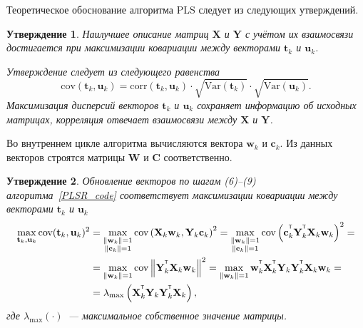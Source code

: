 \documentclass[12pt,twoside]{article}
\newtheorem{statement}{Утверждение}
\newcommand{\bw}{\mathbf{w}}
\newcommand{\bY}{\mathbf{Y}}
\newcommand{\bX}{\mathbf{X}}
\newcommand{\bu}{\mathbf{u}}
\newcommand{\bt}{\mathbf{t}}
\newcommand{\bc}{\mathbf{c}}
\newcommand{\bC}{\mathbf{C}}
\newcommand{\bW}{\mathbf{W}}
\begin{document}
Теоретическое обоснование алгоритма PLS следует из следующих утверждений.
\begin{statement}
Наилучшее описание матриц $\bX$ и $\bY$ с учётом их взаимосвязи достигается при максимизации ковариации между векторами $\bt_k$ и $\bu_k$. 

Утверждение следует из следующего равенства
\[
	\text{cov} (\bt_k, \bu_k) = \text{corr} (\bt_k, \bu_k) \cdot \sqrt{\text{Var}(\bt_k)} \cdot \sqrt{\text{Var}(\bu_k)}.
\]
Максимизация дисперсий векторов $\bt_k$ и $\bu_k$ сохраняет информацию об исходных матрицах, 
корреляция отвечает взаимосвязи между $\bX$ и $\bY$.
\end{statement}
Во внутреннем цикле алгоритма вычисляются вектора $\bw_k$ и $\bc_k$. Из данных векторов строятся матрицы $\bW$ и $\bC$ соответственно.
\begin{statement}
Обновление векторов по шагам (6)--(9) алгоритма~\ref{PLSR_code} соответствует максимизации ковариации между векторами $\bt_k$ и $\bu_k$
\begin{align*}
\max_{\bt_k, \bu_k}  \text{cov} (\bt_k, \bu_k)^2 &= \max_{\substack{\|\bw_k\|=1 \\ \|\bc_k\| = 1}} \text{cov} \left( \bX_k \bw_k, \bY_k \bc_k \right)^2 = \max_{\substack{\|\bw_k\|=1 \\ \|\bc_k\| = 1}} \text{cov} \left(\bc_k^{\T}  \bY_k^{\T} \bX_k \bw_k \right)^2 = \\
&= \max_{\|\bw_k\| = 1} \text{cov} \left\|\bY_k^{\T} \bX_k \bw_k \right\|^2 = \max_{\|\bw_k\| = 1} \bw_k^{\T} \bX_k^{\T} \bY_k \bY_k^{\T} \bX_k \bw_k = \\
& = \lambda_{\max} \left( \bX_k^{\T} \bY_k \bY_k^{\T} \bX_k \right),
\end{align*}
где $ \lambda_{\max} (\cdot)$~--- максимальное собственное значение матрицы.
\end{statement}
\end{document}
